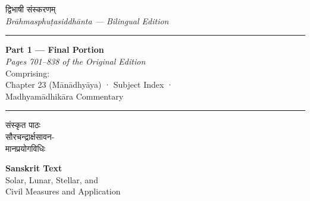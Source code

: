 \documentclass[11pt,a4paper]{article}
\newcommand{\longline}{\noindent\rule{\textwidth}{0.4pt}}
\newcommand{\dev}[1]{{\devanagarifont #1}}
\newcommand{\devbold}[1]{{\devanagarifontbold #1}}
\newenvironment{paracol}[1]{\begingroup}{\endgroup}
\newenvironment{leftcolumn*}{\begingroup}{\endgroup}
\newenvironment{rightcolumn}{\begingroup}{\endgroup}
\begin{document}
\thispagestyle{empty}
\begin{center}
\vspace*{1.5cm}

{\fontsize{12}{14}\selectfont\dev{श्रीब्रह्मगुप्ताचार्य-विरचित}}\\[0.3cm]
{\fontsize{26}{30}\selectfont\devbold{ब्राह्मस्फुटसिद्धान्तः}}\\[0.4cm]
{\Large\devbold{द्विभाषी संस्करणम्}}\\[0.6cm]
{\large\textit{Brāhmasphuṭasiddhānta — Bilingual Edition}}

\vspace{1.2cm}

\longline

\vspace{0.6cm}

{\LARGE\textbf{Part 1 — Final Portion}}\\[0.4cm]
{\large\textit{Pages 701--838 of the Original Edition}}\\[0.3cm]
{\small Comprising:}\\[0.2cm]
{\normalsize Chapter 23 (Mānādhyāya) · Subject Index ·}\\[0.1cm]
{\normalsize Madhyamādhikāra Commentary}

\vspace{0.6cm}

\longline

\vspace{1cm}

\begin{paracol}{2}
\begin{leftcolumn*}
\begin{center}
{\large\devbold{संस्कृत पाठः}}\\[0.3cm]
{\small\dev{सौरचन्द्रार्क्षसावन-\\मानप्रयोगविधिः}}
\end{center}
\end{leftcolumn*}
\begin{rightcolumn}
\begin{center}
{\large\textbf{Sanskrit Text}}\\[0.3cm]
{\small Solar, Lunar, Stellar, and\\Civil Measures and Application}
\end{center}
\end{rightcolumn}
\end{paracol}


\end{center}
\end{document}
